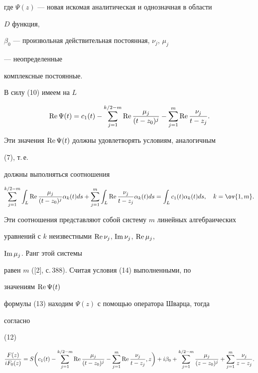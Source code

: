 где $\Psi(z)$ --- новая искомая аналитическая и однозначная в области 


$D$ функция, 


$\beta_0$ --- произвольная действительная постоянная, $\nu_j$, $\mu_j$ 


--- неопределенные 


комплексные постоянные. 


 


В силу (10) имеем на $L$ 


\begin{equation} 


\re\Psi(t)=c_1(t)-\sum^{k/2-m}_{j=1}\re 


\frac{\mu_j}{(t-z_0)^j}-\sum^m_{j=1}\re 


\frac{\nu_j}{t-z_j}. 


\end{equation} 


Эти значения $\operatorname{Re}\Psi(t)$ должны удовлетворять условиям, аналогичным 


(7), т.\,е. 


должны выполняться соотношения 


\begin{equation} 


\sum^{k/2-m}_{j=1}\int_L\re\frac{\mu_j}{(t-z_0)^j} 


\alpha_k(t)ds+\sum^m_{j=1}\int_L 


\re\frac{\nu_j}{t-z_j}\alpha_k(t)ds=\int_L 


c_1(t)\alpha_k(t)ds,\quad k=\ov{1,m}. 


\end{equation} 


Эти соотношения представляют собой систему $m$ линейных алгебраических 


уравнений с $k$ неизвестными $\operatorname{Re}\nu_j$, $\operatorname{Im}\nu_j$, $\operatorname{Re}\mu_j$, 


$\operatorname{Im}\mu_j$. Ранг этой системы 


равен $m$ ([2], с.\,388). Считая условия (14) выполненными, по 


значениям $\operatorname{Re}\Psi(t)$ 


формулы (13) находим $\Psi(z)$ с помощью оператора Шварца, тогда 


согласно 


(12) 


\begin{equation} 


\frac{F(z)}{i F_0(z)}=S\bigg(c_1(t)-\sum^{k/2-m}_{j=1} 


\re\frac{\mu_j}{(t-z_0)^j}-\sum^m_{j=1}\re 


\frac{\nu_j}{t-z_j},z\bigg)+i\beta_0+ 


\sum^{k/2-m}_{j=1}\frac{\mu_j}{(z-z_0)^j}+\sum^m_{j=1} 


\frac{\nu_j}{z-z_j}. 


\end{equation} 


